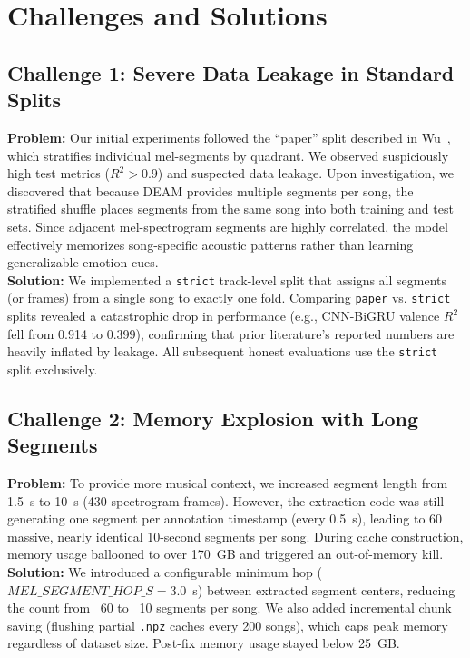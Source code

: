 \documentclass[12pt,a4paper]{article}
\begin{document}
\section{Challenges and Solutions}

\subsection{Challenge 1: Severe Data Leakage in Standard Splits}

\textbf{Problem:} Our initial experiments followed the ``paper'' split described in Wu~\cite{wu2026}, which stratifies individual mel-segments by quadrant. We observed suspiciously high test metrics ($R^2 > 0.9$) and suspected data leakage. Upon investigation, we discovered that because DEAM provides multiple segments per song, the stratified shuffle places segments from the same song into both training and test sets. Since adjacent mel-spectrogram segments are highly correlated, the model effectively memorizes song-specific acoustic patterns rather than learning generalizable emotion cues. \\

\textbf{Solution:} We implemented a \texttt{strict} track-level split that assigns all segments (or frames) from a single song to exactly one fold. Comparing \texttt{paper} vs. \texttt{strict} splits revealed a catastrophic drop in performance (e.g., CNN-BiGRU valence $R^2$ fell from 0.914 to 0.399), confirming that prior literature's reported numbers are heavily inflated by leakage. All subsequent honest evaluations use the \texttt{strict} split exclusively.

\subsection{Challenge 2: Memory Explosion with Long Segments}

\textbf{Problem:} To provide more musical context, we increased segment length from 1.5~s to 10~s (430 spectrogram frames). However, the extraction code was still generating one segment per annotation timestamp (every 0.5~s), leading to 60 massive, nearly identical 10-second segments per song. During cache construction, memory usage ballooned to over 170~GB and triggered an out-of-memory kill. \\

\textbf{Solution:} We introduced a configurable minimum hop ($MEL\_SEGMENT\_HOP\_S = 3.0$~s) between extracted segment centers, reducing the count from ~60 to ~10 segments per song. We also added incremental chunk saving (flushing partial \texttt{.npz} caches every 200 songs), which caps peak memory regardless of dataset size. Post-fix memory usage stayed below 25~GB.
\end{document}
